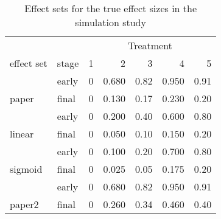 \begin{table}

\caption{\label{tab:table_effect_names}Effect sets for the true effect sizes in the simulation study}
\centering
\begin{tabular}[t]{llrrrrr}
\toprule
\multicolumn{2}{c}{ } & \multicolumn{5}{c}{Treatment} \\
\cmidrule(l{3pt}r{3pt}){3-7}
effect set & stage & 1 & 2 & 3 & 4 & 5\\
\midrule
 & early & 0 & 0.680 & 0.82 & 0.950 & 0.91\\

\multirow{-2}{*}{\raggedright\arraybackslash paper} & final & 0 & 0.130 & 0.17 & 0.230 & 0.20\\
\cmidrule{1-7}
 & early & 0 & 0.200 & 0.40 & 0.600 & 0.80\\

\multirow{-2}{*}{\raggedright\arraybackslash linear} & final & 0 & 0.050 & 0.10 & 0.150 & 0.20\\
\cmidrule{1-7}
 & early & 0 & 0.100 & 0.20 & 0.700 & 0.80\\

\multirow{-2}{*}{\raggedright\arraybackslash sigmoid} & final & 0 & 0.025 & 0.05 & 0.175 & 0.20\\
\cmidrule{1-7}
 & early & 0 & 0.680 & 0.82 & 0.950 & 0.91\\

\multirow{-2}{*}{\raggedright\arraybackslash paper2} & final & 0 & 0.260 & 0.34 & 0.460 & 0.40\\
\bottomrule
\end{tabular}
\end{table}
